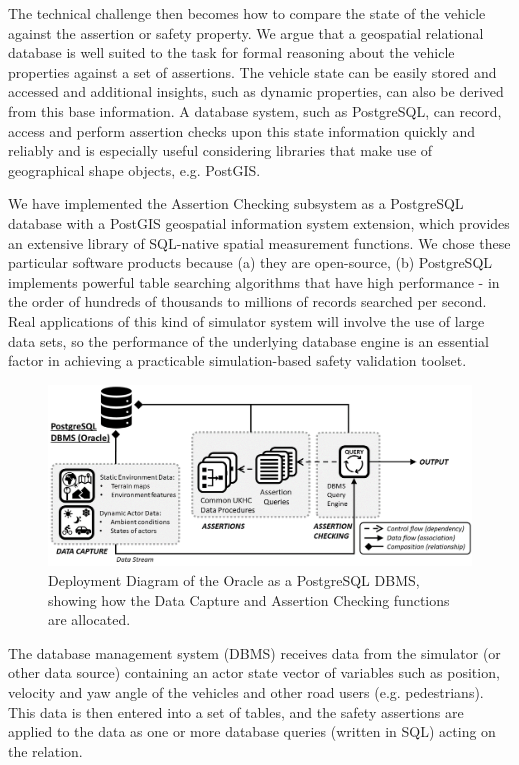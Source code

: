 The technical challenge then becomes how to compare the state of the vehicle against the assertion or safety property. We argue that a geospatial relational database is well suited to the task for formal reasoning about the vehicle properties against a set of assertions. The vehicle state can be easily stored and accessed and additional insights, such as dynamic properties, can also be derived from this base information. A database system, such as PostgreSQL, can record, access and perform assertion checks upon this state information quickly and reliably and is especially useful considering libraries that make use of geographical shape objects, e.g. PostGIS. 

We have implemented the Assertion Checking subsystem as a PostgreSQL database with a PostGIS geospatial information system extension, which provides an extensive library of SQL-native spatial measurement functions. We chose these particular software products because (a) they are open-source, (b) PostgreSQL implements powerful table searching algorithms that have high performance - in the order of hundreds of thousands to millions of records searched per second. Real applications of this kind of simulator system will involve the use of large data sets, so the performance of the underlying database engine is an essential factor in achieving a practicable simulation-based safety validation toolset.

\begin{figure} [h!]
    \centering
    \includegraphics[width=18cm]{../other/figures/DBMS_deployment.png}
    \caption{Deployment Diagram of the Oracle as a PostgreSQL DBMS, showing how the Data Capture and Assertion Checking functions are allocated.}
    \label{fig:dbms_deployment}
\end{figure}

The database management system (DBMS) receives data from the simulator (or other data source) containing an actor state vector of variables such as position, velocity and yaw angle of the vehicles and other road users (e.g. pedestrians). This data is then entered into a set of tables, and the safety assertions are applied to the data as one or more database queries (written in SQL) acting on the relation.

